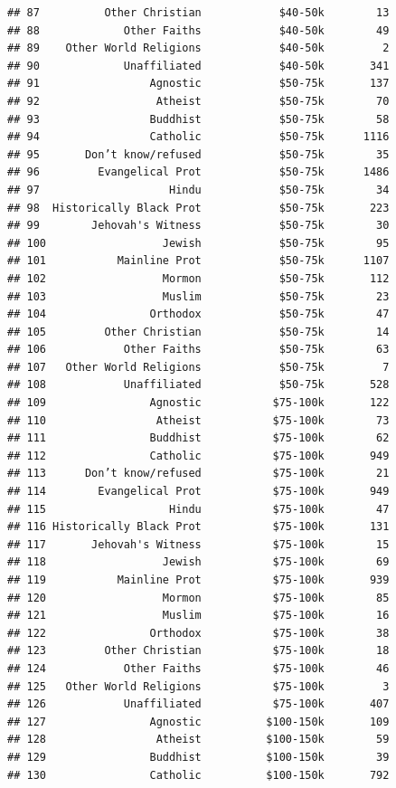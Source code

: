 \documentclass[12pt,letterpaperpaper,openany]{book}
\begin{document}
\begin{verbatim}
## 87          Other Christian            $40-50k        13
## 88             Other Faiths            $40-50k        49
## 89    Other World Religions            $40-50k         2
## 90             Unaffiliated            $40-50k       341
## 91                 Agnostic            $50-75k       137
## 92                  Atheist            $50-75k        70
## 93                 Buddhist            $50-75k        58
## 94                 Catholic            $50-75k      1116
## 95       Don’t know/refused            $50-75k        35
## 96         Evangelical Prot            $50-75k      1486
## 97                    Hindu            $50-75k        34
## 98  Historically Black Prot            $50-75k       223
## 99        Jehovah's Witness            $50-75k        30
## 100                  Jewish            $50-75k        95
## 101           Mainline Prot            $50-75k      1107
## 102                  Mormon            $50-75k       112
## 103                  Muslim            $50-75k        23
## 104                Orthodox            $50-75k        47
## 105         Other Christian            $50-75k        14
## 106            Other Faiths            $50-75k        63
## 107   Other World Religions            $50-75k         7
## 108            Unaffiliated            $50-75k       528
## 109                Agnostic           $75-100k       122
## 110                 Atheist           $75-100k        73
## 111                Buddhist           $75-100k        62
## 112                Catholic           $75-100k       949
## 113      Don’t know/refused           $75-100k        21
## 114        Evangelical Prot           $75-100k       949
## 115                   Hindu           $75-100k        47
## 116 Historically Black Prot           $75-100k       131
## 117       Jehovah's Witness           $75-100k        15
## 118                  Jewish           $75-100k        69
## 119           Mainline Prot           $75-100k       939
## 120                  Mormon           $75-100k        85
## 121                  Muslim           $75-100k        16
## 122                Orthodox           $75-100k        38
## 123         Other Christian           $75-100k        18
## 124            Other Faiths           $75-100k        46
## 125   Other World Religions           $75-100k         3
## 126            Unaffiliated           $75-100k       407
## 127                Agnostic          $100-150k       109
## 128                 Atheist          $100-150k        59
## 129                Buddhist          $100-150k        39
## 130                Catholic          $100-150k       792

\end{verbatim}
\end{document}
